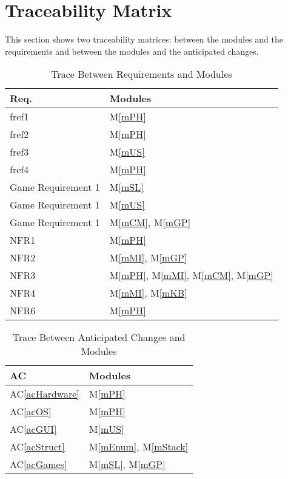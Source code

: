 \documentclass[12pt, titlepage]{article}
\newcommand{\acref}[1]{AC\ref{#1}}
\newcommand{\mref}[1]{M\ref{#1}}
\begin{document}
	\section{Traceability Matrix} \label{SecTM}
	This section shows two traceability matrices: between the modules and the
	requirements and between the modules and the anticipated changes.
	\begin{table}[H]
		\centering
		\begin{tabular}{p{} p{}}
			\toprule
			\textbf{Req.} & \textbf{Modules}\\
			\midrule
			fref1 & \mref{mPH}\\
			fref2 & \mref{mPH}\\
			fref3 & \mref{mUS}\\
			fref4 & \mref{mPH}\\
			Game Requirement 1 & \mref{mSL}\\
			Game Requirement 1 & \mref{mUS}\\
			Game Requirement 1 & \mref{mCM}, \mref{mGP}\\
			NFR1 & \mref{mPH} \\
			NFR2 & \mref{mMI}, \mref{mGP}\\
			NFR3 & \mref{mPH}, \mref{mMI}, \mref{mCM}, \mref{mGP}\\
			NFR4 & \mref{mMI}, \mref{mKB}\\
			NFR6 & \mref{mPH}\\
			\bottomrule
		\end{tabular}
		\caption{Trace Between Requirements and Modules}
		\label{TblRT}
	\end{table}
	\begin{table}[H]
		\centering
		\begin{tabular}{p{} p{}}
			\toprule
			\textbf{AC} & \textbf{Modules}\\
			\midrule
			\acref{acHardware} & \mref{mPH}\\
			\acref{acOS} & \mref{mPH}\\
			\acref{acGUI} & \mref{mUS}\\
			\acref{acStruct} & \mref{mEnum}, \mref{mStack}\\
			\acref{acGames} & \mref{mSL}, \mref{mGP}\\
			\bottomrule
		\end{tabular}
		\caption{Trace Between Anticipated Changes and Modules}
		\label{TblACT}
	\end{table}
\end{document}
